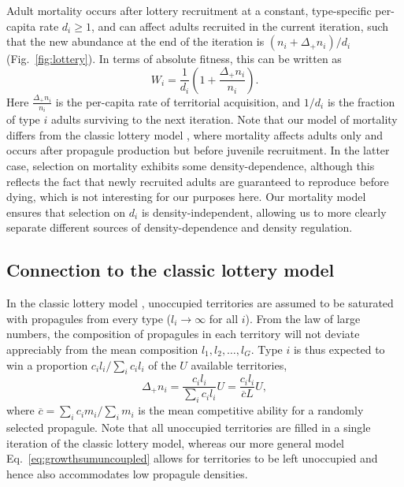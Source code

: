 \documentclass[12pt]{article}
\begin{document}
Adult mortality occurs after lottery recruitment at a constant, type-specific per-capita rate $d_i\geq 1$, and can affect adults recruited in the current iteration, such that the new abundance at the end of the iteration is $(n_i+\Delta_+ n_i)/d_i$ (Fig.~\ref{fig:lottery}). In terms of absolute fitness, this can be written as
\begin{equation}
W_i=\frac{1}{d_i}\left(1+\frac{\Delta_+ n_i}{n_i}\right). \label{eq:absfit}
\end{equation}
Here $\frac{\Delta_+ n_i}{n_i}$ is the per-capita rate of territorial acquisition, and $1/d_i$ is the fraction of type $i$ adults surviving to the next iteration. Note that our model of mortality differs from the classic lottery model \citep{chesson_1981}, where mortality affects adults only and occurs after propagule production but before juvenile recruitment. In the latter case, selection on mortality exhibits some density-dependence, although this reflects the fact that newly recruited adults are guaranteed to reproduce before dying, which is not interesting for our purposes here. Our mortality model ensures that selection on $d_i$ is density-independent, allowing us to more clearly separate different sources of density-dependence and density regulation. 

\subsection*{Connection to the classic lottery model}

In the classic lottery model \citep{chesson_1981}, unoccupied territories are assumed to be saturated with propagules from every type ($l_i\rightarrow \infty$ for all $i$). From the law of large numbers, the composition of propagules in each territory will not deviate appreciably from the mean composition $l_1,l_2,\ldots,l_G$. Type $i$ is thus expected to win a proportion $c_i l_i/\sum_i c_i l_i$ of the $U$ available territories,
\begin{equation}
\Delta_+ n_i=\frac{c_i l_i}{\sum_i c_i l_i}U=\frac{c_i l_i}{\overline{c}L}U, \label{eq:lottery}
\end{equation}
where $\overline{c}=\sum_i c_i m_i/\sum_i m_i$ is the mean competitive ability for a randomly selected propagule. Note that all unoccupied territories are filled in a single iteration of the classic lottery model, whereas our more general model Eq.~\eqref{eq:growthsumuncoupled} allows for territories to be left unoccupied and hence also accommodates low propagule densities. 
\end{document}
